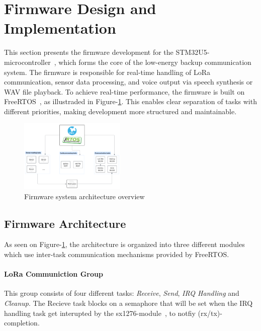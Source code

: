 \section{Firmware Design and Implementation}

This section presents the firmware development for the STM32U5-microcontroller~\cite{stm32u5}, which forms the core of the low-energy backup communication system.
The firmware is responsible for real-time handling of LoRa communication, sensor data processing, and voice output via speech synthesis or WAV file playback. 
To achieve real-time performance, the firmware is built on FreeRTOS~\cite{freertos}, as illustraded in Figure-\ref{fig:firmware-system}. This enables clear separation of tasks with different priorities, making development more structured and maintainable.

\begin{figure}[H]
\centering
\includegraphics[width=0.45\textwidth]{images/firmware-system-design.png}
\caption{Firmware system architecture overview}\label{fig:firmware-system}
\end{figure}

\subsection{Firmware Architecture}

As seen on Figure-\ref{fig:firmware-system}, the architecture is organized into three different modules which use inter-task communication mechanisms provided by FreeRTOS. 

\paragraph{LoRa Communiction Group}

This group consists of four different tasks: \textit{Receive}, \textit{Send}, \textit{IRQ Handling} and \textit{Cleanup}. The Recieve task blocks on a semaphore that will be set when the IRQ handling task get interupted by the sx1276-module~\cite{sx1276}, to notfiy (rx/tx)-completion. 


